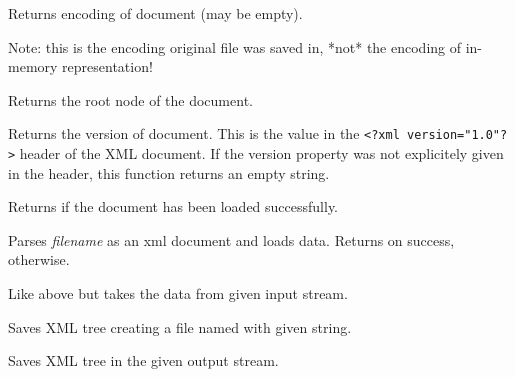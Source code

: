 
Returns encoding of document (may be empty).

Note: this is the encoding original file was saved in, *not* the
encoding of in-memory representation!


\label{wxxmldocumentgetroot}


Returns the root node of the document.


\label{wxxmldocumentgetversion}


Returns the version of document.
This is the value in the {\tt <?xml version="1.0"?>} header of the XML document.
If the version property was not explicitely given in the header, this function
returns an empty string.


\label{wxxmldocumentisok}


Returns \true if the document has been loaded successfully.


\label{wxxmldocumentload}


Parses {\it filename} as an xml document and loads data. Returns \true on success, \false otherwise.


Like above but takes the data from given input stream.

\label{wxxmldocumentsave}


Saves XML tree creating a file named with given string.


Saves XML tree in the given output stream.

\label{wxxmldocumentsetencoding}


